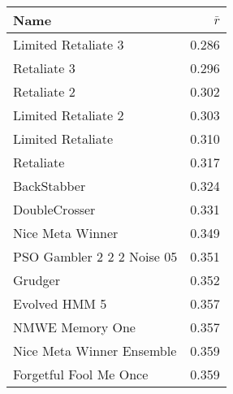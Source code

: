 \begin{tabular}{lr}
\toprule
Name                       &          $\bar{r}$\\
\midrule
Limited Retaliate 3        &            0.286 \\
Retaliate 3                &            0.296 \\
Retaliate 2                &            0.302 \\
Limited Retaliate 2        &            0.303 \\
Limited Retaliate          &            0.310 \\
Retaliate                  &            0.317 \\
BackStabber                &            0.324 \\
DoubleCrosser              &            0.331 \\
Nice Meta Winner           &            0.349 \\
PSO Gambler 2 2 2 Noise 05 &            0.351 \\
Grudger                    &            0.352 \\
Evolved HMM 5              &            0.357 \\
NMWE Memory One            &            0.357 \\
Nice Meta Winner Ensemble  &            0.359 \\
Forgetful Fool Me Once     &            0.359 \\
\bottomrule
\end{tabular}
